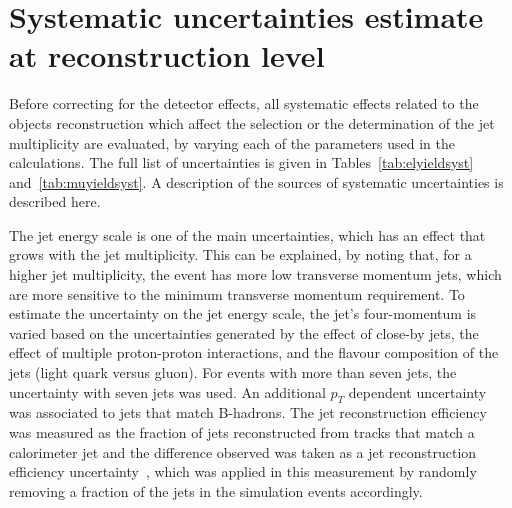 
\section{Systematic uncertainties estimate at reconstruction level}
\label{sec:ttjets_syst}

Before correcting for the detector effects, all systematic effects related to the
objects reconstruction which affect the selection or the determination of the jet multiplicity are evaluated,
by varying each of the parameters used in the calculations.
The full list of uncertainties is given in
Tables~\ref{tab:elyieldsyst} and~\ref{tab:muyieldsyst}. A description of the sources of systematic uncertainties is described here.

The jet energy scale is one of the main uncertainties, which has an effect that grows with the jet multiplicity. This can
be explained, by noting that, for a higher jet multiplicity, the event has more low transverse momentum jets, which are more
sensitive to the minimum transverse momentum requirement.
To estimate the uncertainty on the jet energy scale,
the jet's four-momentum is varied based on the uncertainties generated by the effect of close-by jets, the effect of multiple proton-proton interactions,
and the flavour composition of the jets (light quark versus gluon). For events with more than seven jets, the uncertainty with seven jets was used.
An additional $p_T$ dependent uncertainty was associated to jets that match B-hadrons.
The jet reconstruction efficiency was measured as the
fraction of jets reconstructed from tracks that match a calorimeter jet and the difference observed was taken as a jet reconstruction efficiency uncertainty~\cite{ttjets_jer},
which was applied in this measurement by randomly removing a fraction of the jets in the simulation events accordingly.

